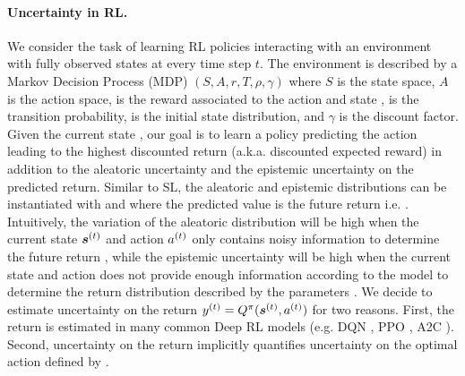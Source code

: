 \paragraph{Uncertainty in RL.} We consider the task of learning RL policies interacting with an environment with fully observed states at every time step $t$. The environment is described by a Markov Decision Process (MDP) $(S, A, r, T, \rho, \gamma)$ where $S$ is the state space, $A$ is the action space,  is the reward associated to the action  and state \smash{$\s\datatx$},  is the transition probability,  is the initial state distribution, and $\gamma$ is the discount factor. Given the current state \smash{$\s\datatx$}, our goal is to learn a policy predicting the action  leading to the highest discounted return  (a.k.a. discounted expected reward) in addition to the aleatoric uncertainty  and the epistemic uncertainty  on the predicted return. Similar to SL, the aleatoric and epistemic distributions can be instantiated with \smash{$\prob(\y\datatx \mid \expparam\datatx)$} and \smash{$\prior(\expparam\datatx \mid \priorparam\datatx)$} where the predicted value is the future return i.e. . Intuitively, the variation of the aleatoric distribution will be high when the current state $\s\datatx$ and action $a^{(t)}$ only contains noisy information to determine the future return \smash{$\y\datatx$}, while the epistemic uncertainty will be high when the current state \smash{$\s\datatx$} and action  does not provide enough information according to the model to determine the return distribution \smash{$\prior(\expparam\datatx \mid \priorparam\datatx)$} described by the parameters \smash{$\priorparam\datatx$}.  We decide to estimate uncertainty on the return $y^{(t)}=Q^{\operatorname{\pi}}(\bm{s}^{(t)}, a^{(t)})$ for two reasons. First, the return is estimated in many common Deep RL models (e.g. DQN \cite{dqn}, PPO \cite{ppo}, A2C \cite{a2c}). Second, uncertainty on the return implicitly quantifies uncertainty on the optimal action defined by . 

